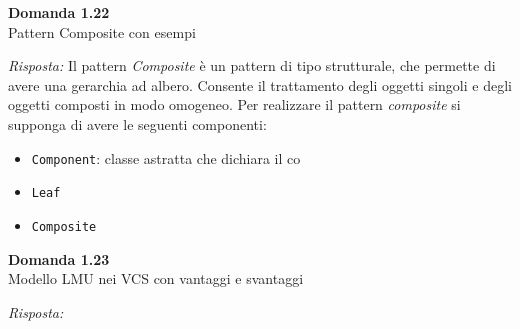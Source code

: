 \documentclass{article}
\newenvironment{problem}[2][Domanda]
    { \begin{mdframed}[backgroundcolor=gray!20] \textbf{#1 #2} \\}
    {  \end{mdframed}}
\newenvironment{solution}
    {\textit{Risposta:}}
    {}
\begin{document}
\begin{problem}{1.22}
Pattern Composite con esempi
\end{problem}
\begin{solution}
Il pattern \textit{Composite} è un pattern di tipo strutturale, che permette di avere una gerarchia ad albero.
Consente il trattamento degli oggetti singoli e degli oggetti composti in modo omogeneo.
Per realizzare il pattern \textit{composite} si supponga di avere le seguenti componenti:
\begin{itemize}
	\item \texttt{Component}: classe astratta che dichiara il co
	\item \texttt{Leaf}
	\item \texttt{Composite}
\end{itemize}
\end{solution}

\begin{problem}{1.23}
Modello LMU nei VCS con vantaggi e svantaggi
\end{problem}
\begin{solution}
\end{solution}
\newpage
\end{document}
